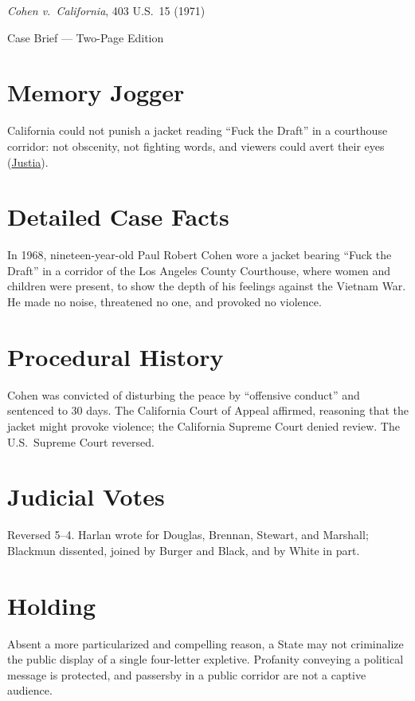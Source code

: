 \documentclass[12pt]{article}
\begin{document}
\begin{center}
{\LARGE \textit{Cohen v.\ California}, 403 U.S.\ 15 (1971)\par}
\vspace{0.5em}
{\large Case Brief --- Two-Page Edition\par}
\end{center}

\section{Memory Jogger}
California could not punish a jacket reading ``Fuck the Draft'' in a courthouse corridor: not obscenity, not fighting words, and viewers could avert their eyes (\href{https://supreme.justia.com/cases/federal/us/403/15/}{Justia}).

\section{Detailed Case Facts}
In 1968, nineteen-year-old Paul Robert Cohen wore a jacket bearing ``Fuck the Draft'' in a corridor of the Los Angeles County Courthouse, where women and children were present, to show the depth of his feelings against the Vietnam War. He made no noise, threatened no one, and provoked no violence.

\section{Procedural History}
Cohen was convicted of disturbing the peace by ``offensive conduct'' and sentenced to 30 days. The California Court of Appeal affirmed, reasoning that the jacket might provoke violence; the California Supreme Court denied review. The U.S.\ Supreme Court reversed.

\section{Judicial Votes}
Reversed 5--4. Harlan wrote for Douglas, Brennan, Stewart, and Marshall; Blackmun dissented, joined by Burger and Black, and by White in part.

\section{Holding}
Absent a more particularized and compelling reason, a State may not criminalize the public display of a single four-letter expletive. Profanity conveying a political message is protected, and passersby in a public corridor are not a captive audience.
\end{document}

